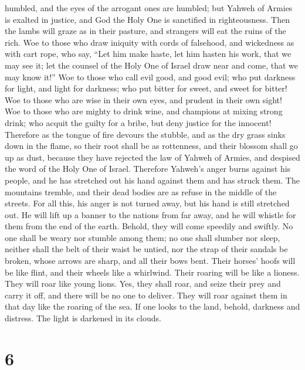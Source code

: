 humbled, and the eyes of the arrogant ones are humbled; 
but Yahweh of Armies is exalted in justice, and God the Holy One is
sanctified in righteousness.  Then the lambs will graze as
in their pasture, and strangers will eat the ruins of the rich.
 Woe to those who draw iniquity with cords of falsehood,
and wickedness as with cart rope,  who say, ``Let him make
haste, let him hasten his work, that we may see it; let the counsel of
the Holy One of Israel draw near and come, that we may know it!''
 Woe to those who call evil good, and good evil; who put
darkness for light, and light for darkness; who put bitter for sweet,
and sweet for bitter!  Woe to those who are wise in their
own eyes, and prudent in their own sight!  Woe to those who
are mighty to drink wine, and champions at mixing strong drink;
 who acquit the guilty for a bribe, but deny justice for
the innocent!  Therefore as the tongue of fire devours the
stubble, and as the dry grass sinks down in the flame, so their root
shall be as rottenness, and their blossom shall go up as dust, because
they have rejected the law of Yahweh of Armies, and despised the word of
the Holy One of Israel.  Therefore Yahweh's anger burns
against his people, and he has stretched out his hand against them and
has struck them. The mountains tremble, and their dead bodies are as
refuse in the middle of the streets. For all this, his anger is not
turned away, but his hand is still stretched out.  He will
lift up a banner to the nations from far away, and he will whistle for
them from the end of the earth. Behold, they will come speedily and
swiftly.  No one shall be weary nor stumble among them; no
one shall slumber nor sleep, neither shall the belt of their waist be
untied, nor the strap of their sandals be broken,  whose
arrows are sharp, and all their bows bent. Their horses' hoofs will be
like flint, and their wheels like a whirlwind.  Their
roaring will be like a lioness. They will roar like young lions. Yes,
they shall roar, and seize their prey and carry it off, and there will
be no one to deliver.  They will roar against them in that
day like the roaring of the sea. If one looks to the land, behold,
darkness and distress. The light is darkened in its clouds.

\hypertarget{section-5}{%
\section{6}\label{section-5}}

